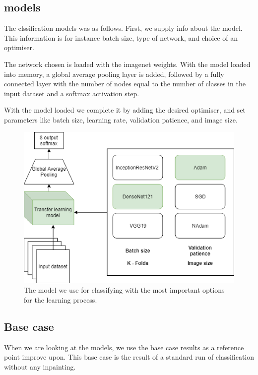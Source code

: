 \subsection{models}
The clssification models was as follows.
First, we supply info about the model. This information is for instance batch size, type of network, and choice of an optimiser. 

The network chosen is loaded with the imagenet weights. With the model loaded into memory, a global average pooling layer is added, followed by a fully connected layer with the number of nodes equal to the number of classes in the input dataset and a softmax activation step.

With the model loaded we complete it by adding the desired optimiser, and set parameters like batch size, learning rate, validation patience, and image size.

\begin{figure}[h]
        \centering
        \includegraphics[scale=0.7]{experiments/figures/model.png}
        \caption{ The model we use for classifying with the most important options for the learning process. }
    \label{fig:KTLmodel}
\end{figure}



\subsection{Base case}
When we are looking at the models, we use the base case results as a reference point improve upon. 
This base case is the result of a standard run of classification without any inpainting. 


